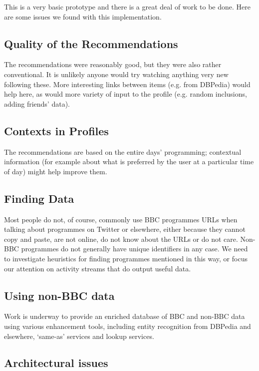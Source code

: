 \documentclass[]{article}
\begin{document}
This is a very basic prototype and there is a great deal of work to be done. Here are some issues we found with this implementation.

\subsection{Quality of the Recommendations}

The recommendations were reasonably good, but they were also rather conventional. It is unlikely anyone would try watching anything very new following these. More interesting links between items (e.g. from DBPedia) would help here, as would more variety of input  to the profile (e.g. random inclusions, adding friends' data).

\subsection{Contexts in Profiles}

The recommendations are based on the entire days' programming; contextual information (for example about what is preferred by the user at a particular time of day) might help improve them.

\subsection{Finding Data}

Most people do not, of course, commonly use BBC programmes URLs when talking about programmes on Twitter or elsewhere, either because they cannot copy and paste, are not online, do not know about the URLs or do not care. Non-BBC programmes do not generally have unique identifiers in any case. We need to investigate heuristics for finding programmes mentioned in this way, or focus our attention on activity streams that do output useful data.

\subsection{Using non-BBC data}

Work is underway to provide an enriched database of BBC and non-BBC data using various enhancement tools, including entity recognition from DBPedia and elsewhere, `same-as' services and lookup services.

\subsection{Architectural issues}
\end{document}
